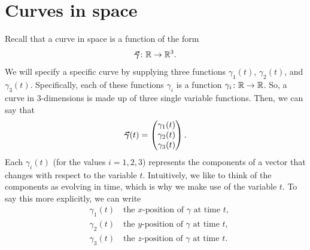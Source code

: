         
        \section{Curves in space}
        
        Recall that a curve in space is a function of the form
        \[
        \boldsymbol{\vec{\gamma}} \colon \mathbb{R} \to \mathbb{R}^3.
        \]
        We will specify a specific curve by supplying three functions $\gamma_1(t)$, $\gamma_2(t)$, and $\gamma_3(t)$. Specifically, each of these functions $\gamma_i$ is a function $\gamma_i\colon \mathbb{R} \to \mathbb{R}$. So, a curve in 3-dimensions is made up of three single variable functions. Then, we can say that
        \[
        \boldsymbol{\vec{\gamma}}(t)=\begin{pmatrix} \gamma_1(t)\\ \gamma_2(t)\\ \gamma_3(t)\end{pmatrix}.
        \]
       Each $\gamma_i(t)$ (for the values $i=1,2,3$) represents the components of a vector that changes with respect to the variable $t$. Intuitively, we like to think of the components as evolving in time, which is why we make use of the variable $t$. To say this more explicitly, we can write
        \begin{align*}
            &\gamma_1(t) \quad \textrm{the $x$-position of $\gamma$ at time $t$,}\\
            &\gamma_2(t) \quad \textrm{the $y$-position of $\gamma$ at time $t$,}\\
            &\gamma_3(t) \quad \textrm{the $z$-position of $\gamma$ at time $t$.}
        \end{align*}
        
